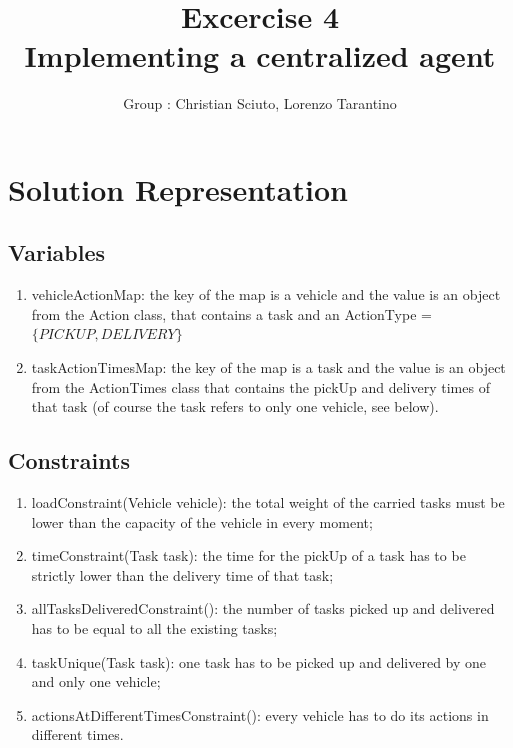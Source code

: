 \documentclass[11pt]{article}
\title{\bf Excercise 4\\ Implementing a centralized agent}
\author{Group \textnumero{15} : Christian Sciuto, Lorenzo Tarantino}
\begin{document}
\maketitle

\section{Solution Representation}

\subsection{Variables}
\begin{enumerate}
\item vehicleActionMap: the key of the map is a vehicle and the value is an object from the Action class, that contains a task and an ActionType = $\{PICKUP, DELIVERY\}$
\item taskActionTimesMap: the key of the map is a task and the value is an object from the ActionTimes class that contains the pickUp and delivery times of that task (of course the task refers to only one vehicle, see below).
\end{enumerate}

\subsection{Constraints}
\begin{enumerate}
\item loadConstraint(Vehicle vehicle): the total weight of the carried tasks must be lower than the capacity of the vehicle in every moment;
\item timeConstraint(Task task): the time for the pickUp of a task has to be strictly lower than the delivery time of that task;
\item allTasksDeliveredConstraint(): the number of tasks picked up and delivered has to be equal to all the existing tasks;
\item taskUnique(Task task): one task has to be picked up and delivered by one and only one vehicle;
\item actionsAtDifferentTimesConstraint(): every vehicle has to do its actions in different times.
\end{enumerate}
\end{document}
